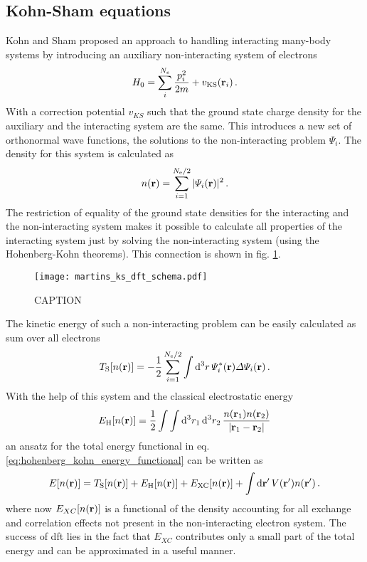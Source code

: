 \documentclass[main.tex]{subfiles}
\begin{document}
\subsection{Kohn-Sham equations}

Kohn and Sham proposed an approach to handling interacting many-body systems by introducing an auxiliary non-interacting system of electrons \cite{kohn_self-consistent_1965}
\begin{equation}\label{eq:kohn_sham_hamiltonian}
    H_0 = \sum_i^{N_e} \frac{p_i^2}{2m} + v_{\mathrm{KS}} (\vb{r}_i)\,.
\end{equation}
With a correction potential \(v_{KS}\) such that the ground state charge density for the auxiliary and the interacting system are the same.
This introduces a new set of orthonormal wave functions, the solutions to the non-interacting problem \(\Psi_i\).
The density for this system is calculated as
\begin{equation}\label{eq:density_ks_states}
    n(\vb{r}) = \sum_{i=1}^{N_{\mathrm{e}} / 2} \vert \Psi_i (\vb{r}) \vert^2\,.
\end{equation}
The restriction of equality of the ground state densities for the interacting and the non-interacting system makes it possible to calculate all properties of the interacting system just by solving the non-interacting system (using the Hohenberg-Kohn theorems).
This connection is shown in fig. \ref{fig:kohn_sham_dft_schema}.
\begin{figure}[ht!]
    \centering
    \texttt{[image: martins\_ks\_dft\_schema.pdf]}
    \caption{CAPTION \cite[137]{martin_electronic_2004}}
    \label{fig:kohn_sham_dft_schema}
\end{figure}

The kinetic energy of such a non-interacting problem can be easily calculated as sum over all electrons
\begin{equation}
    T_{\mathrm{S}} [n(\vb{r})] = - \frac{1}{2} \sum_{i=1}^{N_{\mathrm{e}} / 2} \int \dd[3]{r} \Psi_i^* (\vb{r}) \Delta \Psi_i (\vb{r})\,.
\end{equation}
With the help of this system and the classical electrostatic energy 
\begin{equation}
    E_{\mathrm{H}} [n(\vb{r})] = \frac{1}{2} \int \int \dd[3]{r_1} \dd[3]{r_2} \frac{n(\vb{r}_1) n(\vb{r}_2)}{\vert \vb{r}_1 - \vb{r}_2 \vert}
\end{equation}
an ansatz for the total energy functional in eq. \ref{eq:hohenberg_kohn_energy_functional} can be written as
\begin{equation}
    E[n(\vb{r})] = T_{\mathrm{S}} [n(\vb{r})] + E_{\mathrm{H}} [n(\vb{r})] + E_{\mathrm{XC}} [n(\vb{r})] + \int \dd{\vb{r}^{\prime}} V(\vb{r}^{\prime}) n (\vb{r}^{\prime})\,.
\end{equation}
where now \(E_{XC} [n(\vb{r})]\) is a functional of the density accounting for all exchange and correlation effects not present in the non-interacting electron system.
The success of \acrshort{dft} lies in the fact that \(E_{XC}\) contributes only a small part of the total energy and can be approximated in a useful manner. 
\end{document}
